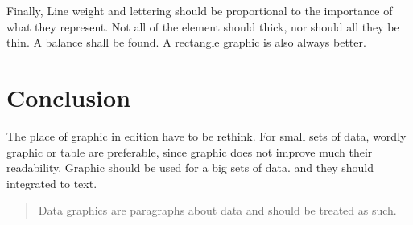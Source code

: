 Finally, Line weight and lettering should be proportional to the importance of what they represent. Not all of the element should thick, nor should all they be thin. A balance shall be found. A rectangle graphic is also always better.
\section{Conclusion}

The place of graphic in edition have to be rethink. For small sets of data, wordly graphic or table are preferable, since graphic does not improve much their readability. Graphic should be used for a big sets of data. and they should integrated to text. 
\begin{quote}
Data graphics are paragraphs about data and should be treated as such.
\end{quote}
